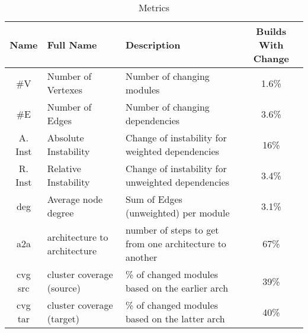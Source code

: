 \begin{table*}
	\caption{Metrics}
	\label{tableMetric}
	\centering
	\begin{tabular}{ | c | l | l | c |  }
		\hline
		Name & Full Name & Description & Builds With Change \\
		\hline
		\#V & Number of Vertexes & Number of changing modules & 1.6\%  \\
		\#E & Number of Edges & Number of changing dependencies & 3.6\% \\
		A. Inst & Absolute Instability & Change of instability for weighted dependencies & 16\% \\
		R. Inst & Relative Instability & Change of instability for unweighted dependencies & 3.4\% \\
		deg & Average node degree & Sum of Edges (unweighted) per module & 3.1\% \\
		a2a & architecture to architecture & number of steps to get from one architecture to another & 67\% \\
		cvg src & cluster coverage (source) & \% of changed modules based on the earlier arch & 39\% \\
		cvg tar & cluster coverage (target) & \% of changed modules based on the latter arch & 40\% \\
		\hline
	\end{tabular}
\end{table*}
